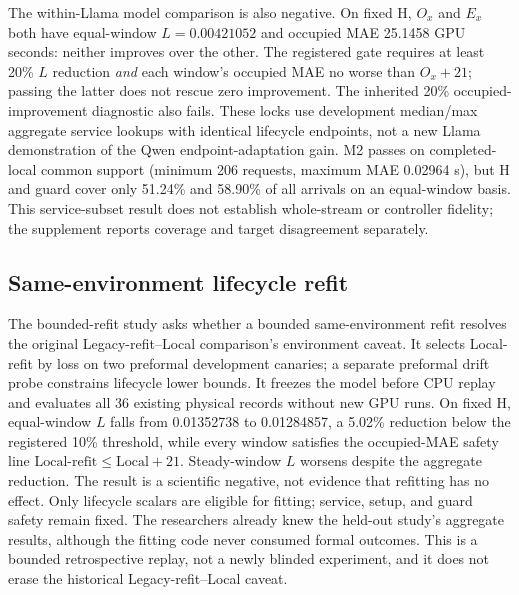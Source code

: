 The within-Llama model comparison is also negative. On fixed H, $O_x$ and $E_x$
both have equal-window $L=0.00421052$ and occupied MAE 25.1458 GPU seconds:
neither improves over the other. The registered gate requires at least 20\%
$L$ reduction \emph{and} each window's occupied MAE no worse than $O_x+21$;
passing the latter does not rescue zero improvement. The inherited 20\%
occupied-improvement diagnostic also fails. These locks use development
median/max aggregate service lookups with identical lifecycle endpoints, not
a new Llama demonstration of the Qwen endpoint-adaptation gain. M2 passes on
completed-local common support (minimum 206 requests, maximum MAE 0.02964 s),
but H and guard cover only 51.24\% and 58.90\% of all arrivals on an equal-window
basis. This service-subset result does not establish whole-stream or controller
fidelity; the supplement reports coverage and target disagreement separately.

\subsection{Same-environment lifecycle refit}
The bounded-refit study asks whether a bounded same-environment refit resolves the original Legacy-refit--Local
comparison's environment caveat. It selects Local-refit by loss on two preformal
development canaries; a separate preformal drift probe constrains lifecycle
lower bounds. It freezes the model before CPU replay and evaluates all
36 existing physical records without new GPU runs. On fixed H, equal-window
$L$ falls from 0.01352738 to 0.01284857, a 5.02\% reduction below the registered
10\% threshold, while every window satisfies the occupied-MAE safety line
$\text{Local-refit}\leq\text{Local}+21$. Steady-window $L$ worsens despite the aggregate reduction.
The result is a scientific negative, not evidence that refitting has no effect.
Only lifecycle scalars are eligible for fitting; service, setup, and guard
safety remain fixed. The researchers already knew the held-out study's aggregate results,
although the fitting code never consumed formal outcomes. This is a bounded
retrospective replay, not a newly blinded experiment, and it does not erase the
historical Legacy-refit--Local caveat.
